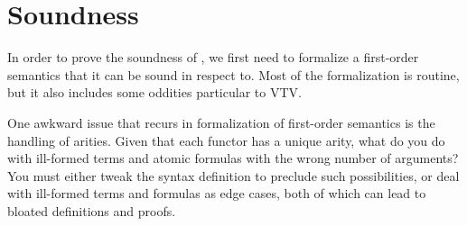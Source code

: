 \documentclass[12pt]{article}
\begin{document}
\section{Soundness} \label{sec:soundness}

In order to prove the soundness of , we first need to formalize 
a first-order semantics that it can be sound in respect to. Most of the formalization 
is routine, but it also includes some oddities particular to VTV.

One awkward issue that recurs in formalization of first-order semantics is the 
handling of arities. Given that each functor has a unique arity,
what do you do with ill-formed terms and atomic formulas with the wrong 
number of arguments? You must either tweak the syntax definition to 
preclude such possibilities, or deal with ill-formed terms and formulas as 
edge cases, both of which can lead to bloated definitions and proofs. 
\end{document}
